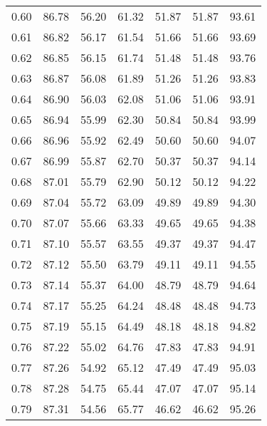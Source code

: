 \begin{tabular}{|c|c|c|c|c|c|c|}
      0.60 &     86.78 &     56.20 &      61.32 &   51.87 &      51.87 &         93.61 \\
      0.61 &     86.82 &     56.17 &      61.54 &   51.66 &      51.66 &         93.69 \\
      0.62 &     86.85 &     56.15 &      61.74 &   51.48 &      51.48 &         93.76 \\
      0.63 &     86.87 &     56.08 &      61.89 &   51.26 &      51.26 &         93.83 \\
      0.64 &     86.90 &     56.03 &      62.08 &   51.06 &      51.06 &         93.91 \\
      0.65 &     86.94 &     55.99 &      62.30 &   50.84 &      50.84 &         93.99 \\
      0.66 &     86.96 &     55.92 &      62.49 &   50.60 &      50.60 &         94.07 \\
      0.67 &     86.99 &     55.87 &      62.70 &   50.37 &      50.37 &         94.14 \\
      0.68 &     87.01 &     55.79 &      62.90 &   50.12 &      50.12 &         94.22 \\
      0.69 &     87.04 &     55.72 &      63.09 &   49.89 &      49.89 &         94.30 \\
      0.70 &     87.07 &     55.66 &      63.33 &   49.65 &      49.65 &         94.38 \\
      0.71 &     87.10 &     55.57 &      63.55 &   49.37 &      49.37 &         94.47 \\
      0.72 &     87.12 &     55.50 &      63.79 &   49.11 &      49.11 &         94.55 \\
      0.73 &     87.14 &     55.37 &      64.00 &   48.79 &      48.79 &         94.64 \\
      0.74 &     87.17 &     55.25 &      64.24 &   48.48 &      48.48 &         94.73 \\
      0.75 &     87.19 &     55.15 &      64.49 &   48.18 &      48.18 &         94.82 \\
      0.76 &     87.22 &     55.02 &      64.76 &   47.83 &      47.83 &         94.91 \\
      0.77 &     87.26 &     54.92 &      65.12 &   47.49 &      47.49 &         95.03 \\
      0.78 &     87.28 &     54.75 &      65.44 &   47.07 &      47.07 &         95.14 \\
      0.79 &     87.31 &     54.56 &      65.77 &   46.62 &      46.62 &         95.26 \\

\end{tabular}
